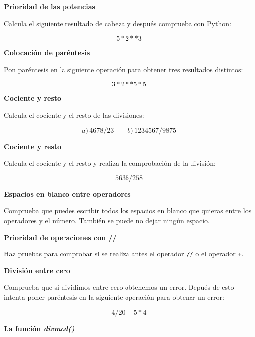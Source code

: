 \documentclass[a4paper, 11pt]{scrartcl}
\begin{document}
\noindent\textbf{\sffamily Prioridad de las potencias}

Calcula el siguiente resultado de cabeza y después comprueba con Python:

$$
5 * 2 ** 3
$$





\noindent\textbf{\sffamily Colocación de paréntesis}

Pon paréntesis en la siguiente operación para obtener tres resultados distintos:

$$
3*2**5*5
$$





\noindent\textbf{\sffamily Cociente y resto}

Calcula el cociente y el resto de las divisiones:

$$
a)\,4678 / 23 \qquad b)\, 1234567 / 9875
$$





\noindent\textbf{\sffamily Cociente y resto}

Calcula el cociente y el resto y realiza la comprobación de la división:

$$
5635 / 258
$$





\noindent\textbf{\sffamily Espacios en blanco entre operadores}

Comprueba que puedes escribir todos los espacios en blanco que quieras entre los operadores y el número. También se puede no dejar ningún espacio.





\noindent\textbf{\sffamily \dag{}  Prioridad de operaciones con //}

Haz pruebas para comprobar si se realiza antes el operador \verb|//| o el operador \verb|+|.





\noindent\textbf{\sffamily \dag{} División entre cero}

Comprueba que si dividimos entre cero obtenemos un error. Depués de esto intenta poner paréntesis en la siguiente operación para obtener un error:

$$
4 / 20 - 5 * 4
$$





\noindent\textbf{\sffamily \dag{}  La función \textit{divmod()}}
\end{document}
